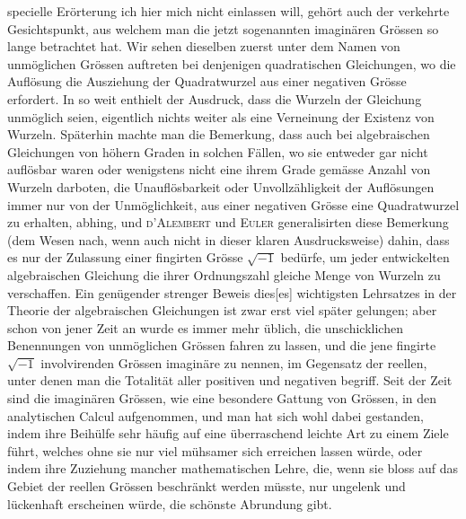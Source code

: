 \noindent specielle Erörterung ich hier mich nicht einlassen will, gehört auch der verkehrte Gesichtspunkt, aus welchem man die jetzt sogenannten imaginären Grössen so lange betrachtet hat. Wir sehen dieselben zuerst unter dem Namen von unmöglichen Grössen auftreten bei denjenigen quadratischen Gleichungen, wo die Auflösung die Ausziehung der Quadratwurzel aus einer negativen Grösse erfordert. In so weit enthielt der Ausdruck, dass die Wurzeln der Gleichung unmöglich seien, eigentlich nichts weiter als eine Verneinung der Existenz von Wurzeln. Späterhin machte man die Bemerkung, dass auch bei algebraischen Gleichungen von höhern Graden in solchen Fällen, wo sie entweder gar nicht auflösbar waren oder wenigstens nicht eine ihrem Grade gemässe Anzahl von Wurzeln darboten, die Unauflösbarkeit oder Unvollzähligkeit der Auflösungen immer nur von der Unmöglichkeit, aus einer negativen Grösse eine Quadratwurzel zu erhalten, abhing, und \textsc{d’Alembert} und \textsc{Euler} generalisirten diese Bemerkung (dem Wesen nach, wenn auch nicht in dieser klaren Ausdrucksweise) dahin, dass es nur der Zulassung einer fingirten Grösse \(\surd{-1}\) bedürfe, um jeder entwickelten algebraischen Gleichung die ihrer Ordnungszahl gleiche Menge von Wurzeln zu verschaffen. Ein genügender strenger Beweis dies[es] wichtigsten Lehrsatzes in der Theorie der algebraischen Gleichungen ist zwar erst viel später gelungen; aber schon von jener Zeit an wurde es immer mehr üblich, die unschicklichen Benennungen von unmöglichen Grössen fahren zu lassen, und die jene fingirte \(\surd{-1}\) involvirenden Grössen imaginäre zu nennen, im Gegensatz der reellen, unter denen man die Totalität aller positiven und negativen begriff. Seit der Zeit sind die imaginären Grössen, wie eine besondere Gattung von Grössen, in den analytischen Calcul aufgenommen, und man hat sich wohl dabei gestanden, indem ihre Beihülfe sehr häufig auf eine überraschend leichte Art zu einem Ziele führt, welches ohne sie nur viel mühsamer sich erreichen lassen würde, oder indem ihre Zuziehung mancher mathematischen Lehre, die, wenn sie bloss auf das Gebiet der reellen Grössen beschränkt werden müsste, nur ungelenk und lückenhaft erscheinen würde, die schönste Abrundung gibt.

